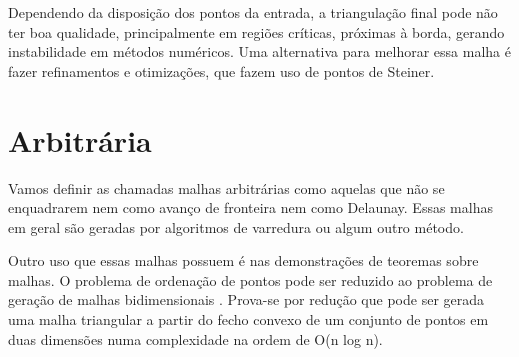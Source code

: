  Dependendo da disposição dos pontos da entrada, a triangulação final pode não ter boa qualidade, principalmente em regiões críticas, próximas à borda, gerando instabilidade em métodos numéricos. Uma alternativa para melhorar essa malha é fazer refinamentos e otimizações, que fazem uso de pontos de Steiner.

\section{Arbitrária}

Vamos definir as chamadas malhas arbitrárias como aquelas que não se enquadrarem nem como avanço de fronteira nem como Delaunay. Essas malhas em geral são geradas por algoritmos de varredura ou algum outro método. 

Outro uso que essas malhas possuem é nas demonstrações de teoremas sobre malhas. O problema de ordenação de pontos pode ser reduzido ao problema de geração de malhas bidimensionais \cite{bib:CarvalhoFigueiredo91}. Prova-se por redução que pode ser gerada uma malha triangular a partir do fecho convexo de um conjunto de pontos em duas dimensões numa complexidade na ordem de O(n log n).

